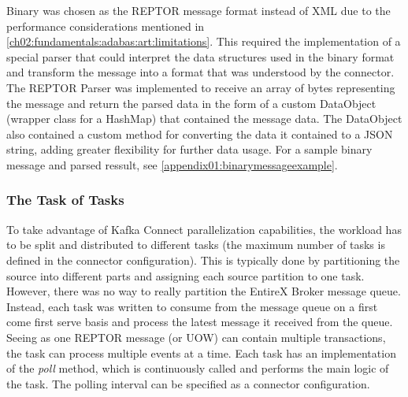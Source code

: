 Binary was chosen as the \ac{REPTOR} message format instead of XML due to the performance considerations mentioned in \ref{ch02:fundamentals:adabas:art:limitations}. This required the implementation of a special parser that could interpret the data structures used in the binary format and transform the message into a format that was understood by the connector. The \ac{REPTOR} Parser was implemented to receive an array of bytes representing the message and return the parsed data in the form of a custom DataObject (wrapper class for a HashMap) that contained the message data. The DataObject also contained a custom method for converting the data it contained to a JSON string, adding greater flexibility for further data usage. For a sample binary message and parsed ressult, see \ref{appendix01:binarymessageexample}.




\subsubsection{The Task of Tasks}
To take advantage of Kafka Connect parallelization capabilities, the workload has to be split and distributed to different tasks (the maximum number of tasks is defined in the connector configuration). This is typically done by partitioning the source into different parts and assigning each source partition to one task. However, there was no way to really partition the EntireX Broker message queue. Instead, each task was written to consume from the message queue on a first come first serve basis and process the latest message it received from the queue. Seeing as one \ac{REPTOR} message (or \ac{UOW}) can contain multiple transactions, the task can process multiple events at a time. Each task has an implementation of the \textit{poll} method, which is continuously called and performs the main logic of the task. The polling interval can be specified as a connector configuration.

